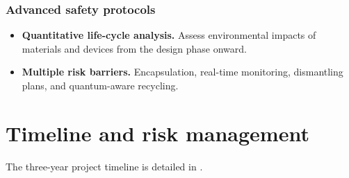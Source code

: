 \documentclass[12pt, a4paper]{article}
\begin{document}
\subsubsection{Advanced safety protocols}

\begin{itemize}
    \item \textbf{Quantitative life-cycle analysis.} Assess environmental impacts of materials and devices from the design phase onward.
    
    \item \textbf{Multiple risk barriers.} Encapsulation, real-time monitoring, dismantling plans, and quantum-aware recycling.
\end{itemize}

\section{Timeline and risk management}
\label{sec:timeline}

The three-year project timeline is detailed in .
\end{document}
